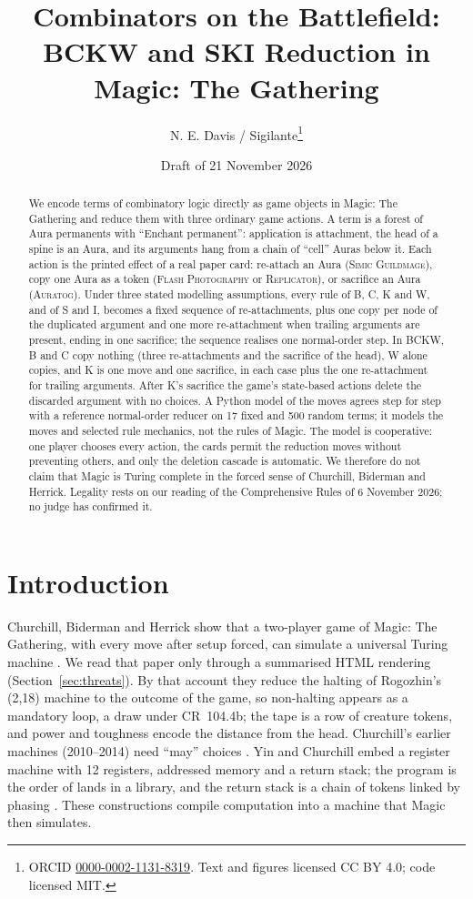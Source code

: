 \documentclass[11pt]{article}
\title{Combinators on the Battlefield:\texorpdfstring{\\}{ }BCKW and SKI Reduction in Magic: The Gathering}
\author{N. E. Davis / Sigilante\thanks{ORCID \href{https://orcid.org/0000-0002-1131-8319}{0000-0002-1131-8319}. Text and figures licensed CC BY 4.0; code licensed MIT.}}
\date{Draft of 21 November 2026}
\theoremstyle{definition}
\newcommand{\card}[1]{{\mdseries\scshape #1}}
\newcommand{\CR}[1]{CR~#1}
\begin{document}
\maketitle

\begin{abstract}
We encode terms of combinatory logic directly as game objects in Magic: The Gathering and
reduce them with three ordinary game actions. A term is a forest of Aura permanents with
``Enchant permanent'': application is attachment, the head of a spine is an Aura, and its
arguments hang from a chain of ``cell'' Auras below it. Each action is the printed effect
of a real paper card: re-attach an Aura (\card{Simic Guildmage}), copy one Aura as a token
(\card{Flash Photography} or \card{Replicator}), or sacrifice an Aura (\card{Auratog}).
Under three stated modelling assumptions, every rule of B, C, K and W, and of S and I,
becomes a fixed sequence of re-attachments, plus one copy per node of the duplicated
argument and one more re-attachment when trailing arguments are present, ending in one
sacrifice; the sequence realises one normal-order step. In BCKW, B and C copy nothing
(three re-attachments and the sacrifice of the head), W alone copies, and K is one move
and one sacrifice, in each case plus the one re-attachment for trailing arguments. After
K's sacrifice the game's state-based actions delete the discarded argument with no
choices. A Python model of the moves agrees step for
step with a reference normal-order reducer on 17 fixed and 500 random terms; it models the
moves and selected rule mechanics, not the rules of Magic. The model is cooperative: one
player chooses every action, the cards permit the reduction moves without preventing
others, and only the deletion cascade is automatic. We therefore do not claim that Magic
is Turing complete in the forced sense of Churchill, Biderman and Herrick. Legality rests
on our reading of the Comprehensive Rules of 6 November 2026; no judge has confirmed it.
\end{abstract}

\section{Introduction}

Churchill, Biderman and Herrick show that a two-player game of Magic: The Gathering,
with every move after setup forced, can simulate a universal Turing machine
\citep{cbh2019}. We read that paper only through a summarised HTML rendering
(Section~\ref{sec:threats}). By that account they reduce the halting of Rogozhin's (2,18)
machine to the outcome of the game, so non-halting appears as a mandatory loop, a draw
under \CR{104.4b}; the tape is a row of creature tokens, and power and toughness encode
the distance from the head. Churchill's earlier machines (2010--2014) need ``may''
choices \citep{churchillsite}. Yin and Churchill embed a register machine with 12
registers, addressed memory and a return stack; the program is the order of lands in a
library, and the return stack is a chain of tokens linked by phasing \citep{yin2024}.
These constructions compile computation into a machine that Magic then simulates.
\end{document}
